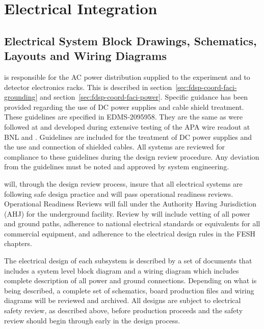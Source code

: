 



\section{Electrical Integration}
\label{sec:fdsp-Integ-electrical}



\subsection{Electrical System Block Drawings, Schematics, Layouts and Wiring Diagrams}
\label{sec:fdsp-coord-electrical}


 is responsible for the AC power
distribution supplied to the experiment and to detector electronics
racks.  This is described in section~\ref{sec:fdsp-coord-faci-grounding} 
and section~\ref{sec:fdsp-coord-faci-power}.  Specific guidance has been provided
regarding the use of DC power supplies and cable shield treatment.
These guidelines are specified in EDMS-2095958.  They are the same as
were followed at  and developed during extensive testing of
the APA wire readout at BNL and .  Guidelines are included
for the treatment of DC power supplies and the use and connection of
shielded cables.  All systems are reviewed for compliance to these
guidelines during the design review procedure.  Any deviation from the
guidelines must be noted and approved by system engineering.

 will, through the design review process, insure
that all electrical systems are following safe design practice and
will pass operational readiness reviews.  Operational Readiness
Reviews will fall under the Authority Having Jurisdiction (AHJ) for the
underground facility.  Review by  will include
vetting of all power and ground paths, adherence to national
electrical standards or equivalents for all commercial equipment, and
adherence to the electrical design rules in the \fnal FESH chapters.

The electrical design of each subsystem is described by a set of
documents that includes a system level block diagram and a wiring
diagram which includes complete description of all power and ground
connections.  Depending on what is being described, a complete set of
schematics, board production files and wiring diagrams will be
reviewed and archived.  All designs are subject to electrical safety
review, as described above, before production proceeds and the safety
review should begin through  early in the design
process.



